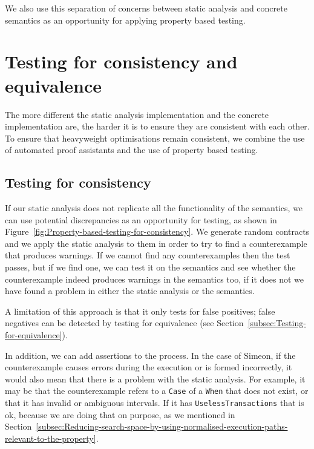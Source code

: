 \documentclass[english,runningheads]{llncs}
\begin{document}
We also use this separation of concerns between static analysis and
concrete semantics as an opportunity for applying
property based testing.%

\section{Testing for consistency and equivalence\label{sec:Testing}}

The more different the static analysis implementation and the concrete
implementation are, the harder it is to ensure they are consistent with
each other. To ensure that heavyweight optimisations remain consistent,
we combine the use of automated proof assistants and the use of property based testing.

\subsection{Testing for consistency\label{subsec:Testing-for-consistency} }

If our static analysis does not replicate all the functionality of
the semantics, we can use potential discrepancies as an opportunity
for testing, as shown in Figure~\ref{fig:Property-based-testing-for-consistency}.
We generate random contracts and we apply the static analysis to them
in order to try to find a counterexample that produces warnings. If
we cannot find any counterexamples then the test passes, but if we
find one, we can test it on the semantics and see whether the counterexample
indeed produces warnings in the semantics too, if it does not we have
found a problem in either the static analysis or the semantics.

A limitation of this approach is that it only tests for false positives; 
false negatives can be detected by testing
for equivalence (see Section~\ref{subsec:Testing-for-equivalence}).

In addition, we can add assertions to the process. In the case of
Simeon, if the counterexample causes errors during the execution or is
formed incorrectly, it would also mean that there is a problem with
the static analysis. For example, it may be that the counterexample
refers to a \texttt{Case} of a \texttt{When} that does not exist,
or that it has invalid or ambiguous intervals. If it has \texttt{UselessTransactions}
that is ok, because we are doing that on purpose, as we mentioned in Section~\ref{subsec:Reducing-search-space-by-using-normalised-execution-paths-relevant-to-the-property}.
\end{document}
